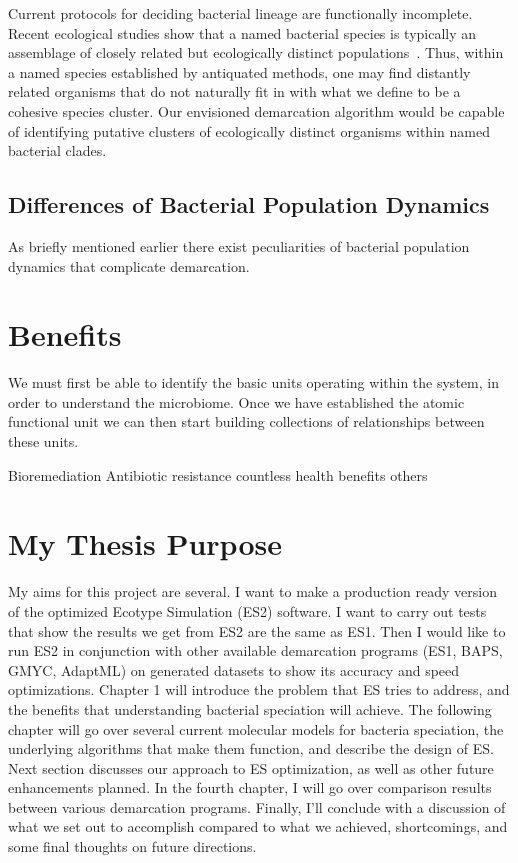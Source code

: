 Current protocols for deciding bacterial lineage are functionally incomplete. Recent ecological studies show that a named bacterial species is typically an assemblage of closely related but ecologically distinct populations~\cite{cohan2007systematics}.
Thus, within a named species established by antiquated methods, one may find distantly related organisms that do not naturally fit in with what we define to be a cohesive species cluster.
Our envisioned demarcation algorithm would be capable of identifying putative clusters of ecologically distinct organisms within named bacterial clades.


\subsection{Differences of Bacterial Population Dynamics}
As briefly mentioned earlier there exist peculiarities of bacterial population dynamics that complicate demarcation.

\section{Benefits}%
We must first be able to identify the basic units operating within the system, in order to understand the microbiome.
Once we have established the atomic functional unit we can then start building collections of relationships between these units. 


Bioremediation
Antibiotic resistance
countless health benefits
others

\section{My Thesis Purpose}%

My aims for this project are several. I want to make a production ready version of the optimized Ecotype Simulation (ES2) software.
I want to carry out tests that show the results we get from ES2 are the same as ES1. 
Then I would like to run ES2 in conjunction with other available demarcation programs (ES1, BAPS, GMYC, AdaptML) on generated datasets to show its accuracy and speed optimizations.
Chapter 1 will introduce the problem that ES tries to address, and the benefits that understanding bacterial speciation will achieve.
The following chapter will go over several current molecular models for bacteria speciation, the underlying algorithms that make them function, and describe the design of ES.
Next section discusses our approach to ES optimization, as well as other future enhancements planned.
In the fourth chapter, I will go over comparison results between various demarcation programs.
Finally, I'll conclude with a discussion of what we set out to accomplish compared to what we achieved, shortcomings, and some final thoughts on future directions.

